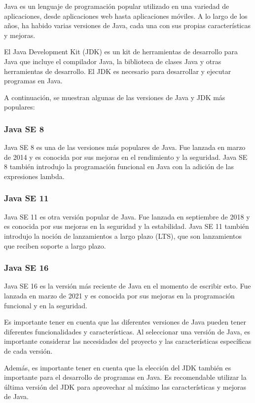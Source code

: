 \documentclass{article}
\begin{document}
Java es un lenguaje de programación popular utilizado en una variedad de aplicaciones, desde aplicaciones web hasta aplicaciones móviles. A lo largo de los años, ha habido varias versiones de Java, cada una con sus propias características y mejoras.

El Java Development Kit (JDK) es un kit de herramientas de desarrollo para Java que incluye el compilador Java, la biblioteca de clases Java y otras herramientas de desarrollo. El JDK es necesario para desarrollar y ejecutar programas en Java.

A continuación, se muestran algunas de las versiones de Java y JDK más populares:

\subsubsection*{Java SE 8}

Java SE 8 es una de las versiones más populares de Java. Fue lanzada en marzo de 2014 y es conocida por sus mejoras en el rendimiento y la seguridad. Java SE 8 también introdujo la programación funcional en Java con la adición de las expresiones lambda.

\subsubsection*{Java SE 11}

Java SE 11 es otra versión popular de Java. Fue lanzada en septiembre de 2018 y es conocida por sus mejoras en la seguridad y la estabilidad. Java SE 11 también introdujo la noción de lanzamientos a largo plazo (LTS), que son lanzamientos que reciben soporte a largo plazo.

\subsubsection*{Java SE 16}

Java SE 16 es la versión más reciente de Java en el momento de escribir esto. Fue lanzada en marzo de 2021 y es conocida por sus mejoras en la programación funcional y en la seguridad.

Es importante tener en cuenta que las diferentes versiones de Java pueden tener diferentes funcionalidades y características. Al seleccionar una versión de Java, es importante considerar las necesidades del proyecto y las características específicas de cada versión.

Además, es importante tener en cuenta que la elección del JDK también es importante para el desarrollo de programas en Java. Es recomendable utilizar la última versión del JDK para aprovechar al máximo las características y mejoras de Java.
\end{document}
